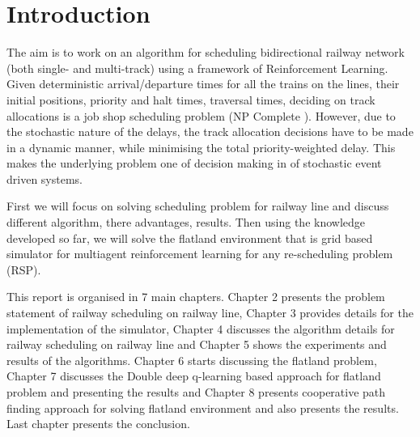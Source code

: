 \titleformat{\chapter}[display]{\normalfont\Large\bfseries}{}{11pt}{\Huge}
\chapter{Introduction}
\hspace{3mm}


The aim is to work on an algorithm for scheduling
bidirectional railway network (both single- and multi-track) using a
framework of Reinforcement Learning. Given deterministic arrival/departure times for
 all the trains on the lines, their initial positions, 
 priority and halt times, traversal times, deciding on track allocations is a 
 job shop scheduling problem (NP Complete ). However, 
 due to the stochastic nature of the delays, 
 the track allocation decisions have to be made in a dynamic manner, 
 while minimising the total priority-weighted delay. 
 This makes the underlying problem one of decision making in of 
 stochastic event driven systems. 

 \vspace{\baselineskip}
First we will focus on solving scheduling problem for railway line and discuss different algorithm, there 
advantages, results. Then using the knowledge developed so far, we will solve the flatland environment\cite{ARTICLE:3} that is 
grid based simulator for multiagent reinforcement learning for any re-scheduling problem (RSP). 


\vspace{\baselineskip}
This report is organised in 7 main chapters. Chapter 2 presents the problem statement of railway scheduling on railway line, 
Chapter 3 provides details for the implementation of the simulator, Chapter 4 discusses the algorithm details for railway scheduling on railway line and 
Chapter 5 shows the experiments and results of the algorithms. Chapter 6 starts discussing the flatland problem, 
Chapter 7 discusses the 
Double deep q-learning based approach for flatland problem and presenting the results and Chapter 8 presents 
cooperative path finding approach for solving flatland environment and also presents the results. Last chapter presents the 
conclusion.
